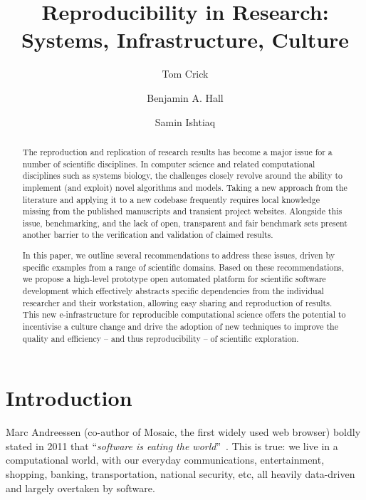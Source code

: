 \documentclass[a4paper,11pt]{article}
\title{Reproducibility in Research: Systems, Infrastructure, Culture}
\author[1]{Tom Crick}
\author[2]{Benjamin A. Hall}
\author[3]{Samin Ishtiaq}
\affil[1]{Cardiff Metropolitan University, UK}
\affil[2]{University of Cambridge, UK}
\affil[3]{Microsoft Research Cambridge, UK}
\affil[1]{\protect\url{tcrick@cardiffmet.ac.uk}}
\affil[2]{\protect\url{bh418@mrc-cu.cam.ac.uk}}
\affil[3]{\protect\url{samin.ishtiaq@microsoft.com}}
\date{ }
\begin{document}
\maketitle



\begin{abstract}
The reproduction and replication of research results has become a
major issue for a number of scientific disciplines. In computer
science and related computational disciplines such as systems biology,
the challenges closely revolve around the ability to implement (and
exploit) novel algorithms and models. Taking a new approach from the
literature and applying it to a new codebase frequently requires local
knowledge missing from the published manuscripts and transient project
websites. Alongside this issue, benchmarking, and the lack of open,
transparent and fair benchmark sets present another barrier to the
verification and validation of claimed results.

In this paper, we outline several recommendations to address these
issues, driven by specific examples from a range of scientific
domains.  Based on these recommendations, we propose a high-level
prototype open automated platform for scientific software development
which effectively abstracts specific dependencies from the individual
researcher and their workstation, allowing easy sharing and
reproduction of results. This new e-infrastructure for reproducible
computational science offers the potential to incentivise a culture
change and drive the adoption of new techniques to improve the quality
and efficiency -- and thus reproducibility -- of scientific
exploration.
\end{abstract}

\section{Introduction}

Marc Andreessen (co-author of Mosaic, the first widely used web
browser) boldly stated in 2011 that ``{\emph{software is eating the
world}}''~\cite{andreessen:2011}. This is true: we live in a
computational world, with our everyday communications, entertainment,
shopping, banking, transportation, national security, etc, all heavily
data-driven and largely overtaken by software.
\end{document}
